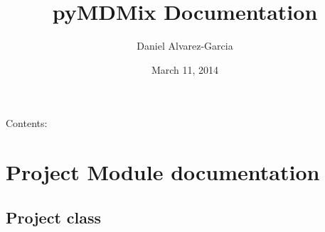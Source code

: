 \documentclass[letterpaper,10pt,english]{sphinxmanual}
\title{pyMDMix Documentation}
\date{March 11, 2014}
\author{Daniel Alvarez-Garcia}
\begin{document}
\maketitle
\tableofcontents
{}\label{index::doc}


Contents:


\chapter{Project Module documentation}
\label{project:module-pyMDMix.Project}\label{project:welcome-to-pymdmix-s-documentation}\label{project::doc}\label{project:project-module-documentation}

\section{Project class}
\label{project:project-class}
\end{document}
